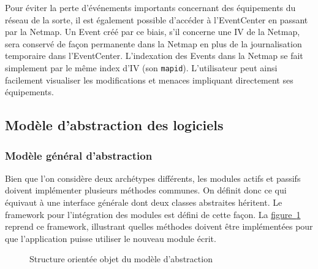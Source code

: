 \documentclass[]{article}
\newcommand{\wordlink}[2]{\hyperref[#1]{#2~\ref{#1}}}
\begin{document}
\par Pour éviter la perte d'événements importants concernant des équipements du réseau de la sorte, il est également possible d'accéder à l'EventCenter en passant par la Netmap. Un Event créé par ce biais, s'il concerne une IV de la Netmap, sera conservé de façon permanente dans la Netmap en plus de la journalisation temporaire dans l'EventCenter. L'indexation des Events dans la Netmap se fait simplement par le même index d'IV (son \texttt{mapid}). L'utilisateur peut ainsi facilement visualiser les modifications et menaces impliquant directement ses équipements.


\subsection{Modèle d'abstraction des logiciels}
\label{abstrmodel}

\subsubsection{Modèle général d'abstraction}

Bien que l'on considère deux archétypes différents, les modules actifs et passifs doivent implémenter plusieurs méthodes communes. On définit donc ce qui équivaut à une interface générale dont deux classes abstraites héritent. Le framework pour l'intégration des modules est défini de cette façon. La \wordlink{abstrmodeldiag}{figure} reprend ce framework, illustrant quelles méthodes doivent être implémentées pour que l'application puisse utiliser le nouveau module écrit.
\vspace{-0.4cm}
    \begin{figure}[!h]
       \noindent{}
       \caption{Structure orientée objet du modèle d'abstraction}
       \label{abstrmodeldiag}
    \end{figure}
\end{document}
